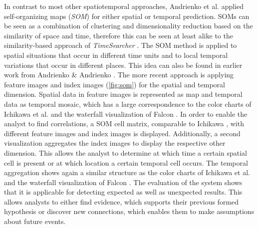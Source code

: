 \documentclass[electronic]{vgtc}             %
\begin{document}
In contrast to most other spatiotemporal approaches, Andrienko et al. \cite{Andrienko:2010:Space} applied self-organizing maps (\textit{SOM}) for either spatial or temporal prediction.
SOMs can be seen as a combination of clustering and dimensionality reduction based on the similarity of space and time, therefore this can be seen at least alike to the similarity-based approach of \textit{TimeSearcher} \cite{buono:2007}.
The SOM method is applied to spatial situations that occur in different time units and to local temporal variations that occur in different places.
This idea can also be found in earlier work from Andrienko \& Andrienko \cite{Andrienko:2005}.
The more recent approach is applying feature images and index images (\autoref{fig:som}) for the spatial and temporal dimension.
Spatial data in feature images is represented as map and temporal data as temporal mosaic, which has a large correspondence to the color charts of Ichikawa et al. \cite{ichikawa:2002} and the waterfall visualization of Falcon \cite{steed:2017}.
In order to enable the analyst to find correlations, a SOM cell matrix, comparable to Ichikawa \cite{ichikawa:2002}, with different feature images and index images is displayed.
Additionally, a second visualization aggregates the index images to display the respective other dimension.
This allows the analyst to determine at which time a certain spatial cell is present or at which location a certain temporal cell occurs.
The temporal aggregation shows again a similar structure as the color charts of Ichikawa et al. \cite{ichikawa:2002} and the waterfall visualization of Falcon \cite{steed:2017}.
The evaluation of the system shows that it is applicable for detecting expected as well as unexpected results.
This allows analysts to either find evidence, which supports their previous formed hypothesis or discover new connections, which enables them to make assumptions about future events. 
\end{document}

